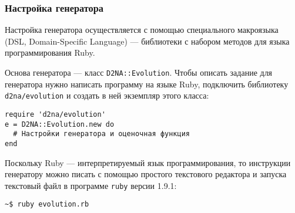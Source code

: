 \documentclass[utf8,a5paper,portrait,12pt]{eskdtext}
\begin{document}
\subsubsection{Настройка генератора}
Настройка генератора осуществляется с помощью специального макроязыка
(DSL, Domain-Specific Language) — библиотеки с набором методов для языка
программирования Ruby.

Основа генератора — класс \texttt{D2NA::Evolution}. Чтобы описать задание для
генератора нужно написать программу на языке Ruby, подключить библиотеку
\texttt{d2na/evolution} и создать в ней экземпляр этого класса:

\begin{verbatim}
require 'd2na/evolution'
e = D2NA::Evolution.new do
  # Настройки генератора и оценочная функция
end
\end{verbatim}

Поскольку Ruby — интерпретируемый язык программирования, то инструкции
генератору можно писать с помощью простого текстового редактора и запуска
текстовый файл в программе \texttt{ruby} версии 1.9.1:

\begin{verbatim}
~$ ruby evolution.rb
\end{verbatim}
\end{document}
